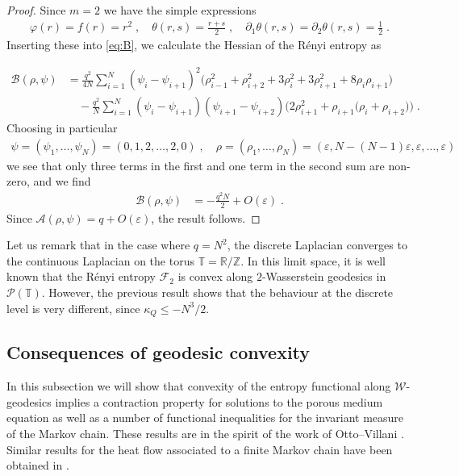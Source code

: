 \documentclass[a4paper,11pt,reqno]{amsart}
\theoremstyle{plain}
\theoremstyle{remark}
\numberwithin{equation}{section}
\begin{document}
\begin{proof}
Since $m =2$ we have the simple expressions
\begin{align}\label{eq:m-2}
{\varphi}(r) = f(r) = r^{2}\;,\quad
\theta(r,s) = \frac{r+s}{2}\;,\quad
\partial_1 \theta(r,s) =\partial_2\theta(r,s) = \frac12\;.
\end{align}
Inserting these into \eqref{eq:B}, we calculate the Hessian of the
R\'enyi entropy as

\begin{align*}
  {\mathcal{B}}(\rho,\psi) & = \frac{q^2}{4N} \sum_{i=1}^N (\psi_i - \psi_{i+1})^2
  \bigg(\rho_{i-1}^2+\rho_{i+2}^2+3\rho_{i}^2+3\rho_{i+1}^2+8\rho_{i}\rho_{i+1} \bigg) 
\\& \quad - \frac{q^2}{N} \sum_{i=1}^N (\psi_i -
  \psi_{i+1})(\psi_{i+1} - \psi_{i+2}) \bigg( 2\rho_{i+1}^2 + \rho_{i+1}\big(\rho_{i}+\rho_{i+2}\big)\bigg)\;.
\end{align*}
Choosing  in particular 
\begin{align*}
  \psi=(\psi_1,\dots,\psi_N)=(0,1,2,\dots,2,0)\;,\quad\rho=(\rho_1,\dots,\rho_N)=({\varepsilon},N-(N-1){\varepsilon},{\varepsilon},\dots,{\varepsilon})
\end{align*}
we see that only three terms in the first and one term in the second
sum are non-zero, and we find 
\begin{align*}
  {\mathcal{B}}(\rho,\psi) & = -\frac{q^2N}{2} + O({\varepsilon}) \;.
\end{align*}
Since ${\mathcal{A}}(\rho,\psi) = q + O({\varepsilon})$, the result follows.
\end{proof}

Let us remark that in the case where $q = N^2$, the discrete Laplacian
converges to the continuous Laplacian on the torus $\mathbb{T} = {{\mathbb R}} /
{{\mathbb Z}}$. In this limit space, it is well known that the R\'enyi entropy
${\mathcal{F}}_2$ is convex along $2$-Wasserstein geodesics in
${\mathscr{P}}(\mathbb{T})$. However, the previous result shows that the
behaviour at the discrete level is very different, since $\kappa_Q
\leq - N^3/2$.

\subsection{Consequences of geodesic convexity}

In this subsection we will show that convexity of the entropy
functional along ${\mathcal{W}}$-geodesics implies a contraction property for
solutions to the porous medium equation as well as a number of
functional inequalities for the invariant measure of the Markov
chain. These results are in the spirit of the work of Otto--Villani
\cite{OV00}. Similar results for the heat flow associated to a finite
Markov chain have been obtained in \cite{EM11}.
\end{document}
